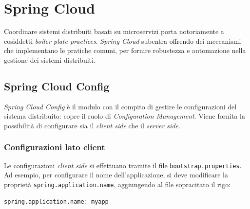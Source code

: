 
\chapter{Spring Cloud}



\bigskip

Coordinare sistemi distribuiti basati su microservizi porta notoriamente a cosiddetti \textit{boiler plate practices}. \textit{Spring Cloud} subentra offrendo dei meccanismi che implementano le pratiche comuni, per fornire robustezza e automazione nella gestione dei sistemi distribuiti.

\clearpage


\section{Spring Cloud Config}

\textit{Spring Cloud Config} è il modulo con il compito di gestire le configurazioni del sistema distribuito: copre il ruolo di \textit{Configuration Management}.
Viene fornita la possibilità di configurare sia il \textit{client side} che il \textit{server side}.

\subsection{Configurazioni lato client} Le configurazioni \textit{client side} si effettuano tramite
il file \texttt{bootstrap.properties}. Ad esempio, per configurare il nome dell'applicazione, si deve
modificare la proprietà \texttt{spring.application.name}, aggiungendo al file sopracitato il rigo:

\begin{tcolorbox}
\texttt{spring.application.name: myapp}
\end{tcolorbox}

